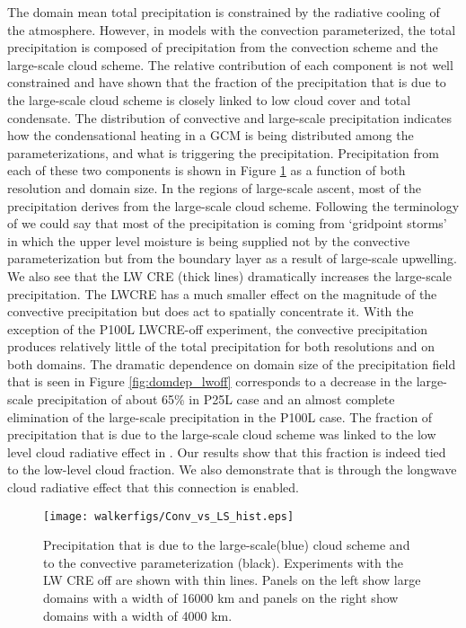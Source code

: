 \documentclass[draft]{agujournal2019}
\begin{document}
The domain mean total precipitation is constrained by the radiative cooling of the atmosphere.  
However, in models with the convection parameterized, the 
total precipitation is composed of precipitation from the convection scheme and the large-scale cloud scheme. 
The relative contribution of each component is not well constrained and  have shown 
that the fraction of the precipitation that is due to the large-scale cloud scheme is closely linked 
to low cloud cover and total condensate.  
The distribution of convective and large-scale precipitation indicates how the condensational heating
in a GCM is being distributed among the parameterizations, and what is triggering the precipitation.  
Precipitation from each of these two components is
shown in Figure \ref{fig:conv_vs_ls} as a function of both resolution and domain size.  
In the regions of large-scale ascent, most of the 
precipitation derives from the large-scale cloud scheme.  
Following the terminology of  we could say that most of the precipitation is 
coming from `gridpoint storms' in which the upper level moisture is being supplied not 
by the convective parameterization but from the boundary layer as a result of large-scale upwelling.
We also see that the LW CRE (thick lines) dramatically increases
the large-scale precipitation.  The LWCRE has a much smaller effect on the magnitude of the convective 
precipitation 
but does act to spatially concentrate it.  With the exception 
of the P100L LWCRE-off experiment, the convective precipitation produces relatively little of the total precipitation for 
both resolutions and on both domains.  The dramatic dependence on domain size of the precipitation field that is 
seen in Figure \ref{fig:domdep_lwoff} corresponds to a decrease in the large-scale precipitation of about 65\% in P25L case
and an almost complete elimination of the large-scale precipitation in the P100L case.    
The fraction of precipitation that is due to the large-scale cloud scheme was linked to the low level cloud radiative
effect in . Our results show that this fraction is indeed tied to the low-level cloud fraction.  
We also demonstrate that is through the longwave cloud radiative effect that this connection is enabled.

\begin{figure}
  \centering
      \texttt{[image: walkerfigs/Conv\_vs\_LS\_hist.eps]}
  \caption{Precipitation that is due to the large-scale(blue) cloud scheme and to the convective 
  parameterization (black).  Experiments with the LW CRE off are shown with thin lines.  
  Panels on the left show large domains with a width of 16000 km and
  panels on the right show domains with a width of 4000 km.}
  \label{fig:conv_vs_ls}
\end{figure}
\end{document}
